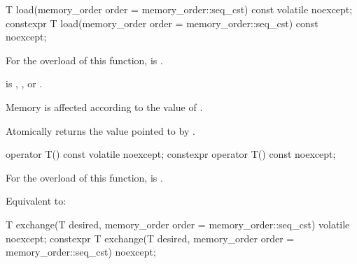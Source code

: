 %
%
%
%
%
%
\begin{itemdecl}
T load(memory_order order = memory_order::seq_cst) const volatile noexcept;
constexpr T load(memory_order order = memory_order::seq_cst) const noexcept;
\end{itemdecl}

\begin{itemdescr}
\pnum
\constraints
For the  overload of this function,
 is .

\pnum
\expects
{} is
,
, or
.

\pnum
\effects
Memory is affected according to the value of .

\pnum
\returns
Atomically returns the value pointed to by .
\end{itemdescr}

%
%
%
%
\begin{itemdecl}
operator T() const volatile noexcept;
constexpr operator T() const noexcept;
\end{itemdecl}

\begin{itemdescr}
\pnum
\constraints
For the  overload of this function,
 is .

\pnum
\effects
Equivalent to: 
\end{itemdescr}


%
%
%
%
%
%
\begin{itemdecl}
T exchange(T desired, memory_order order = memory_order::seq_cst) volatile noexcept;
constexpr T exchange(T desired, memory_order order = memory_order::seq_cst) noexcept;
\end{itemdecl}


